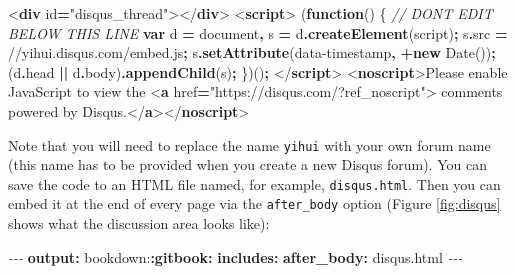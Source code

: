 \documentclass[
  12pt,
]{krantz}
\newenvironment{Shaded}{\begin{snugshade}}{\end{snugshade}}
\newcommand{\AttributeTok}[1]{\textcolor[rgb]{0.13,0.29,0.53}{#1}}
\newcommand{\BuiltInTok}[1]{#1}
\newcommand{\CommentTok}[1]{\textcolor[rgb]{0.56,0.35,0.01}{\textit{#1}}}
\newcommand{\DataTypeTok}[1]{\textcolor[rgb]{0.13,0.29,0.53}{#1}}
\newcommand{\FunctionTok}[1]{\textcolor[rgb]{0.13,0.29,0.53}{\textbf{#1}}}
\newcommand{\KeywordTok}[1]{\textcolor[rgb]{0.13,0.29,0.53}{\textbf{#1}}}
\newcommand{\NormalTok}[1]{#1}
\newcommand{\OperatorTok}[1]{\textcolor[rgb]{0.81,0.36,0.00}{\textbf{#1}}}
\newcommand{\OtherTok}[1]{\textcolor[rgb]{0.56,0.35,0.01}{#1}}
\newcommand{\PreprocessorTok}[1]{\textcolor[rgb]{0.56,0.35,0.01}{\textit{#1}}}
\newcommand{\StringTok}[1]{\textcolor[rgb]{0.31,0.60,0.02}{#1}}
\theoremstyle{definition}
\theoremstyle{definition}
\theoremstyle{definition}
\theoremstyle{definition}
\theoremstyle{remark}
\begin{document}
\begin{Shaded}
\begin{Highlighting}[]
\DataTypeTok{\textless{}}\KeywordTok{div}\OtherTok{ id}\OperatorTok{=}\StringTok{"disqus\_thread"}\DataTypeTok{\textgreater{}\textless{}/}\KeywordTok{div}\DataTypeTok{\textgreater{}}
\DataTypeTok{\textless{}}\KeywordTok{script}\DataTypeTok{\textgreater{}}
\NormalTok{(}\KeywordTok{function}\NormalTok{() \{ }\CommentTok{// DON\textquotesingle{}T EDIT BELOW THIS LINE}
\KeywordTok{var}\NormalTok{ d }\OperatorTok{=} \BuiltInTok{document}\OperatorTok{,}\NormalTok{ s }\OperatorTok{=}\NormalTok{ d}\OperatorTok{.}\FunctionTok{createElement}\NormalTok{(}\StringTok{\textquotesingle{}script\textquotesingle{}}\NormalTok{)}\OperatorTok{;}
\NormalTok{s}\OperatorTok{.}\AttributeTok{src} \OperatorTok{=} \StringTok{\textquotesingle{}//yihui.disqus.com/embed.js\textquotesingle{}}\OperatorTok{;}
\NormalTok{s}\OperatorTok{.}\FunctionTok{setAttribute}\NormalTok{(}\StringTok{\textquotesingle{}data{-}timestamp\textquotesingle{}}\OperatorTok{,} \OperatorTok{+}\KeywordTok{new} \BuiltInTok{Date}\NormalTok{())}\OperatorTok{;}
\NormalTok{(d}\OperatorTok{.}\AttributeTok{head} \OperatorTok{||}\NormalTok{ d}\OperatorTok{.}\AttributeTok{body}\NormalTok{)}\OperatorTok{.}\FunctionTok{appendChild}\NormalTok{(s)}\OperatorTok{;}
\NormalTok{\})()}\OperatorTok{;}
\DataTypeTok{\textless{}/}\KeywordTok{script}\DataTypeTok{\textgreater{}}
\DataTypeTok{\textless{}}\KeywordTok{noscript}\DataTypeTok{\textgreater{}}\NormalTok{Please enable JavaScript to view the}
\DataTypeTok{\textless{}}\KeywordTok{a}\OtherTok{ href}\OperatorTok{=}\StringTok{"https://disqus.com/?ref\_noscript"}\DataTypeTok{\textgreater{}}
\NormalTok{  comments powered by Disqus.}\DataTypeTok{\textless{}/}\KeywordTok{a}\DataTypeTok{\textgreater{}\textless{}/}\KeywordTok{noscript}\DataTypeTok{\textgreater{}}
\end{Highlighting}
\end{Shaded}

Note that you will need to replace the name \texttt{yihui} with your own forum name (this name has to be provided when you create a new Disqus forum). You can save the code to an HTML file named, for example, \texttt{disqus.html}. Then you can embed it at the end of every page via the \texttt{after\_body} option (Figure \ref{fig:disqus} shows what the discussion area looks like):

\begin{Shaded}
\begin{Highlighting}[]
\PreprocessorTok{{-}{-}{-}}
\FunctionTok{output}\KeywordTok{:}
\AttributeTok{  bookdown:}\FunctionTok{:gitbook}\KeywordTok{:}
\AttributeTok{    }\FunctionTok{includes}\KeywordTok{:}
\AttributeTok{      }\FunctionTok{after\_body}\KeywordTok{:}\AttributeTok{ disqus.html}
\PreprocessorTok{{-}{-}{-}}
\end{Highlighting}
\end{Shaded}
\end{document}

